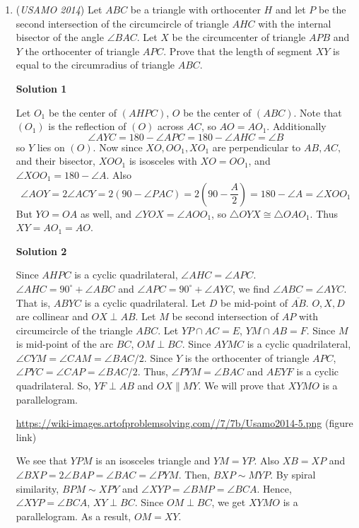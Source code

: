 \begin{enumerate}
 


	\item (\textit{USAMO 2014}) Let $ABC$ be a triangle with orthocenter $H$ and let $P$ be the second intersection of the circumcircle of triangle $AHC$ with the internal bisector of the angle $\angle BAC$.  Let $X$ be the circumcenter of triangle $APB$ and $Y$ the orthocenter of triangle $APC$.  Prove that the length of segment $XY$ is equal to the circumradius of triangle $ABC$.


 



\textbf{Solution 1}

Let $O_1$ be the center of $(AHPC)$, $O$ be the center of $(ABC)$. Note that $(O_1)$ is the reflection of $(O)$ across $AC$, so $AO=AO_1$. Additionally
 \[\angle AYC=180-\angle APC=180-\angle AHC=\angle B\]so $Y$ lies on $(O)$. Now since $XO,OO_1,XO_1$ are perpendicular to $AB,AC,$ and their bisector, $XOO_1$ is isosceles with $XO=OO_1$, and $\angle XOO_1=180-\angle A$. Also
 \[\angle AOY=2\angle ACY=2(90-\angle PAC)=2(90-\frac{A}{2})=180-\angle A = \angle XOO_1\]But $YO=OA$ as well, and $\angle YOX=\angle AOO_1$, so $\triangle OYX\cong \triangle OAO_1$. Thus $XY=AO_1=AO$.

 



\textbf{Solution 2}

Since $AHPC$ is a cyclic quadrilateral, $\angle AHC = \angle APC$. $\angle AHC = 90^\circ + \angle ABC$ and $\angle APC = 90^\circ + \angle AYC$, we find $\angle ABC = \angle AYC$. That is, $ABYC$ is a cyclic quadrilateral. Let $D$ be mid-point of $\overline{AB}$. $O, X, D$ are collinear and $OX \perp AB$. Let $M$ be second intersection of $AP$ with circumcircle of the triangle $ABC$. Let $YP \cap AC = E$, $YM \cap AB = F$. Since $M$ is mid-point of the arc $BC$, $OM\perp BC$. Since $AYMC$ is a cyclic quadrilateral, $\angle CYM = \angle CAM = \angle BAC /2$. Since $Y$ is the orthocenter of triangle $APC$, $\angle PYC = \angle CAP = \angle BAC /2$. Thus, $\angle PYM = \angle BAC$ and $AEYF$ is a cyclic quadrilateral. So, $YF \perp AB$ and $OX \parallel MY$. We will prove that $XYMO$ is a parallelogram.

 \href{https://wiki-images.artofproblemsolving.com//7/7b/Usamo2014-5.png}{https://wiki-images.artofproblemsolving.com//7/7b/Usamo2014-5.png} (figure link)

 We see that $YPM$ is an isosceles triangle and $YM=YP$. Also $XB=XP$ and $\angle BXP = 2\angle BAP = \angle BAC = \angle PYM$. Then, $BXP \sim MYP$. By spiral similarity, $BPM \sim XPY$ and $\angle XYP = \angle BMP = \angle BCA$. Hence, $\angle XYP = \angle BCA$, $XY \perp BC$. Since $OM \perp BC$, we get $XYMO$ is a parallelogram. As a result, $OM = XY$.


\end{enumerate}

